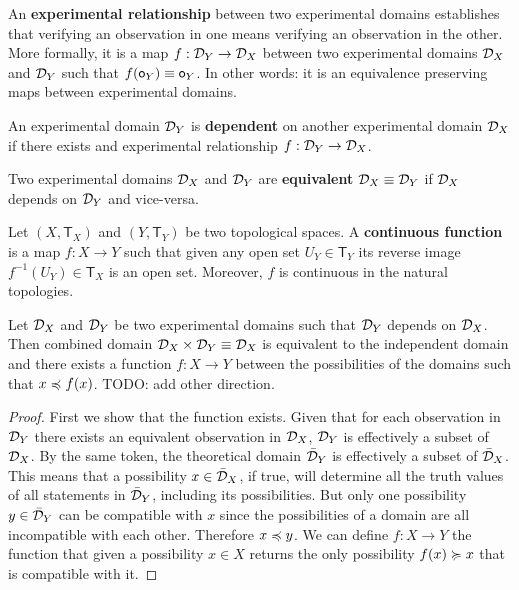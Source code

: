 \documentclass[11pt,letterpaper,fleqn]{memoir} %
\begin{document}
\begin{mathSection}
	\begin{defn}
		An \textbf{experimental relationship} between two experimental domains establishes that verifying an observation in one means verifying an observation in the other. More formally, it is a map $f: \mathcal{D}_Y \to \mathcal{D}_X$ between two experimental domains $\mathcal{D}_X$ and $\mathcal{D}_Y$ such that $f(\mathsf{o}_Y) \equiv \mathsf{o}_Y$. In other words: it is an equivalence preserving maps between experimental domains.
	\end{defn}
	\begin{defn}
		An experimental domain $\mathcal{D}_Y$ is \textbf{dependent} on another experimental domain $\mathcal{D}_X$ if there exists and experimental relationship $f: \mathcal{D}_Y \to \mathcal{D}_X$.
	\end{defn}
	\begin{defn}
		Two experimental domains $\mathcal{D}_X$ and $\mathcal{D}_Y$ are \textbf{equivalent} $\mathcal{D}_X \equiv \mathcal{D}_Y$ if $\mathcal{D}_X$ depends on $\mathcal{D}_Y$ and vice-versa.
	\end{defn}
	\begin{defn}
		Let $(X, \mathsf{T}_X)$ and $(Y, \mathsf{T}_Y)$ be two topological spaces. A \textbf{continuous function} is a map $f: X \to Y$ such that given any open set $U_Y \in \mathsf{T}_Y$ its reverse image $f^{-1}(U_Y) \in \mathsf{T}_X$ is an open set. Moreover, $f$ is continuous in the natural topologies.
	\end{defn}
	\begin{prop}
		Let $\mathcal{D}_X$ and $\mathcal{D}_Y$ be two experimental domains such that $\mathcal{D}_Y$ depends on $\mathcal{D}_X$. Then combined domain $\mathcal{D}_X \times \mathcal{D}_Y \equiv \mathcal{D}_X$ is equivalent to the independent domain and there exists a function $f : X \to Y$ between the possibilities of the domains such that $x \preccurlyeq f(x)$. TODO: add other direction.
	\end{prop}
	\begin{proof}
		First we show that the function exists. Given that for each observation in $\mathcal{D}_Y$ there exists an equivalent observation in $\mathcal{D}_X$, $\mathcal{D}_Y$ is effectively a subset of $\mathcal{D}_X$. By the same token, the theoretical domain $\bar{\mathcal{D}}_Y$ is effectively a subset of $\bar{\mathcal{D}}_X$. This means that a possibility $x \in \bar{\mathcal{D}}_X$, if true, will determine all the truth values of  all statements in $\bar{\mathcal{D}}_Y$, including its possibilities. But only one possibility $y \in \bar{\mathcal{D}}_Y$ can be compatible with $x$ since the possibilities of a domain are all incompatible with each other. Therefore $x \preccurlyeq y$. We can define $f : X \to Y$ the function that given a possibility $x \in X$ returns the only possibility $f(x) \succcurlyeq x$ that is compatible with it.
		

\end{proof}
\end{mathSection}
\end{document}
